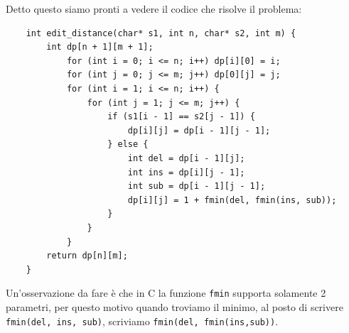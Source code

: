 Detto questo siamo pronti a vedere il codice che risolve il problema:
\begin{verbatim}
    int edit_distance(char* s1, int n, char* s2, int m) {
        int dp[n + 1][m + 1];
            for (int i = 0; i <= n; i++) dp[i][0] = i;
            for (int j = 0; j <= m; j++) dp[0][j] = j;
            for (int i = 1; i <= n; i++) {
                for (int j = 1; j <= m; j++) {
                    if (s1[i - 1] == s2[j - 1]) {
                        dp[i][j] = dp[i - 1][j - 1];
                    } else {
                        int del = dp[i - 1][j];
                        int ins = dp[i][j - 1];
                        int sub = dp[i - 1][j - 1];
                        dp[i][j] = 1 + fmin(del, fmin(ins, sub));
                    }
                }
            }
        return dp[n][m];
    }
\end{verbatim}
Un'osservazione da fare è che in C la funzione \texttt{fmin} supporta solamente 2 parametri, per questo motivo quando troviamo il minimo, al posto di
scrivere \texttt{fmin(del, ins, sub)}, scriviamo \texttt{fmin(del, fmin(ins,sub))}. 